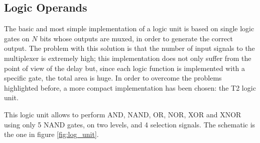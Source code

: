 \subsection{Logic Operands}
The basic and most simple implementation of a logic unit is based on single logic gates on $N$ bits whose outputs are muxed, in order to generate the correct output. The problem with this solution is that the number of input signals to the multiplexer is extremely high; this implementation does not only suffer from the point of view of the delay but, since each logic function is implemented with a specific gate, the total area is huge.\newline\newline
In order to overcome the problems highlighted before, a more compact implementation has been chosen: the T2 logic unit.

This logic unit allows to perform AND, NAND, OR, NOR, XOR and XNOR using only 5 NAND gates, on two levels, and 4 selection signals. The schematic is the one in figure \ref{fig:log_unit}.

